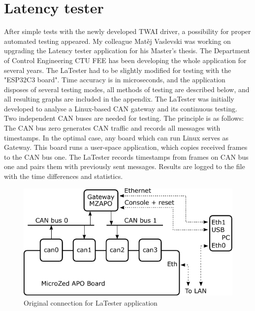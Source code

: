 \documentclass{ctuthesis}
\begin{document}
 \section{Latency tester}
 After simple tests with the newly developed TWAI driver, a possibility for proper automated testing appeared. My colleague Matěj Vaslevski was working on upgrading the Latency tester application for his Master's thesis\cite{thesis-vasilevski}. The Department of Control Engineering CTU FEE has been developing the whole application for several years. The LaTester had to be slightly modified for testing with the "ESP32C3 board". Time accuracy is in microseconds, and the application disposes of several testing modes, all methods of testing are described below, and all resulting graphs are included in the appendix.
The LaTester was initially developed to analyse a Linux-based CAN gateway and its continuous testing. Two independent CAN buses are needed for testing. The principle is as follows: The CAN bus zero generates CAN traffic and records all messages with timestamps. In the optimal case, any board which can run Linux serves as Gateway. This board runs a user-space application, which copies received frames to the CAN bus one. The LaTester records timestamps from frames on CAN bus one and pairs them with previously sent messages. Results are logged to the file with the time differences and statistics.

\clearpage
 \begin{figure}[htb]
 \includegraphics[width=1\textwidth]{images/latester1.pdf}
 \caption{Original connection for LaTester application}
 \end{figure}
\end{document}
